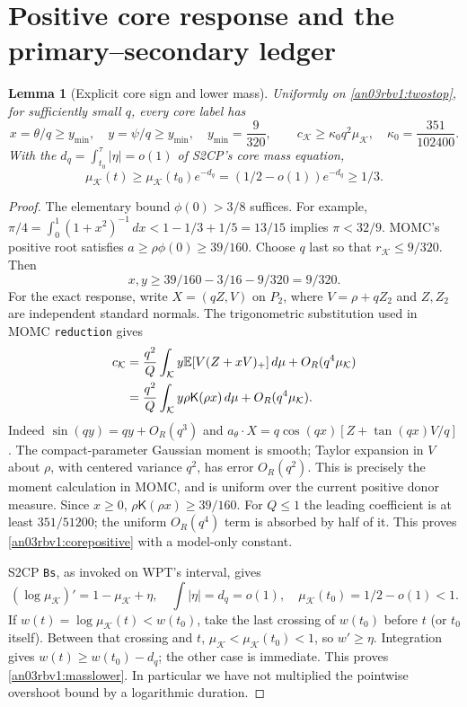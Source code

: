 \documentclass[11pt]{article}
\numberwithin{equation}{section}
\newtheorem{lemma}[theorem]{Lemma}
\theoremstyle{remark}\newtheorem{remark}[theorem]{Remark}
\newcommand{\E}{\mathbb E}
\newcommand{\dd}{\,d}
\newcommand{\KK}{\mathcal K}
\newcommand{\Kfun}{\mathsf K}
\newcommand{\src}[2]{\textup{#1} \texttt{#2}}
\begin{document}
\section{Positive core response and the primary--secondary ledger}
\begin{lemma}[Explicit core sign and lower mass]
\label{an03rbv1:core}
Uniformly on \eqref{an03rbv1:twostop}, for sufficiently small $q$,
every core label has
\begin{equation}
 x=\theta/q\ge y_{\min},\quad y=\psi/q\ge y_{\min},\quad
 y_{\min}=\frac9{320},\qquad
 c_{\KK}\ge\kappa_0q^2\mu_{\KK},\quad
 \kappa_0=\frac{351}{102400}.
 \label{an03rbv1:corepositive}
\end{equation}
With the $d_q=\int_{t_0}^{\tau}|\eta|=o(1)$ of S2CP's core
mass equation,
\begin{equation}
 \mu_{\KK}(t)\ge\mu_{\KK}(t_0)e^{-d_q}
   =(1/2-o(1))e^{-d_q}\ge1/3.
 \label{an03rbv1:masslower}
\end{equation}
\end{lemma}
\begin{proof}
The elementary bound $\phi(0)>3/8$ suffices. For example,
$\pi/4=\int_0^1(1+x^2)^{-1}\dd x<1-1/3+1/5=13/15$
implies $\pi<32/9$. MOMC's positive root satisfies
$a\ge\rho\phi(0)\ge39/160$.
Choose $q$ last so that $r_{\KK}\le9/320$. Then
\[
 x,y\ge39/160-3/16-9/320=9/320.
\]
For the exact response, write $X=(qZ,V)$ on $P_2$, where
$V=\rho+qZ_2$ and $Z,Z_2$ are independent standard normals.
The trigonometric substitution used in \src{MOMC}{reduction} gives
\begin{align}
 c_{\KK}
 &=\frac{q^2}{Q}\int_{\KK} y\E[V(Z+xV)_+]\dd\mu
                  +O_R(q^4\mu_{\KK})\notag\\
 &=\frac{q^2}{Q}\int_{\KK}y\rho\Kfun(\rho x)\dd\mu
                  +O_R(q^4\mu_{\KK}).
 \label{an03rbv1:coremoment}
\end{align}
Indeed $\sin(qy)=qy+O_R(q^3)$ and
$a_\theta\cdot X=q\cos(qx)[Z+\tan(qx)V/q]$.
The compact-parameter Gaussian moment is smooth; Taylor expansion
in $V$ about $\rho$, with centered variance $q^2$, has error
$O_R(q^2)$. This is precisely the moment calculation in MOMC,
and is uniform over the current positive donor measure.
Since $x\ge0$, $\rho\Kfun(\rho x)\ge39/160$.
For $Q\le1$ the leading coefficient is at least $351/51200$;
the uniform $O_R(q^4)$ term is absorbed by half of it. This proves
\eqref{an03rbv1:corepositive} with a model-only constant.

S2CP \texttt{Bs}, as invoked on WPT's interval, gives
\[
 (\log\mu_{\KK})'=1-\mu_{\KK}+\eta,\quad
 \int|\eta|=d_q=o(1),\quad \mu_{\KK}(t_0)=1/2-o(1)<1.
\]
If $w(t)=\log\mu_{\KK}(t)<w(t_0)$, take the last crossing
of $w(t_0)$ before $t$ (or $t_0$ itself). Between that crossing
and $t$, $\mu_{\KK}<\mu_{\KK}(t_0)<1$, so $w'\ge\eta$.
Integration gives $w(t)\ge w(t_0)-d_q$; the other case is immediate.
This proves \eqref{an03rbv1:masslower}. In particular we have not
multiplied the pointwise overshoot bound by a logarithmic duration.
\end{proof}
\end{document}
